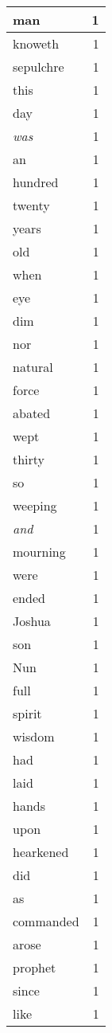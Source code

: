 \begin{center}
\begin{longtable}{l|r}
man & 1 \\ \hline
knoweth & 1 \\ \hline
sepulchre & 1 \\ \hline
this & 1 \\ \hline
day & 1 \\ \hline
\emph{was} & 1 \\ \hline
an & 1 \\ \hline
hundred & 1 \\ \hline
twenty & 1 \\ \hline
years & 1 \\ \hline
old & 1 \\ \hline
when & 1 \\ \hline
eye & 1 \\ \hline
dim & 1 \\ \hline
nor & 1 \\ \hline
natural & 1 \\ \hline
force & 1 \\ \hline
abated & 1 \\ \hline
wept & 1 \\ \hline
thirty & 1 \\ \hline
so & 1 \\ \hline
weeping & 1 \\ \hline
\emph{and} & 1 \\ \hline
mourning & 1 \\ \hline
were & 1 \\ \hline
ended & 1 \\ \hline
Joshua & 1 \\ \hline
son & 1 \\ \hline
Nun & 1 \\ \hline
full & 1 \\ \hline
spirit & 1 \\ \hline
wisdom & 1 \\ \hline
had & 1 \\ \hline
laid & 1 \\ \hline
hands & 1 \\ \hline
upon & 1 \\ \hline
hearkened & 1 \\ \hline
did & 1 \\ \hline
as & 1 \\ \hline
commanded & 1 \\ \hline
arose & 1 \\ \hline
prophet & 1 \\ \hline
since & 1 \\ \hline
like & 1 \\ \hline

\end{longtable}
\end{center}
